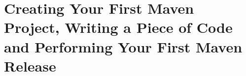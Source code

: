 
\chapter{Creating Your First Maven Project, Writing a Piece of Code and Performing Your First Maven Release}









